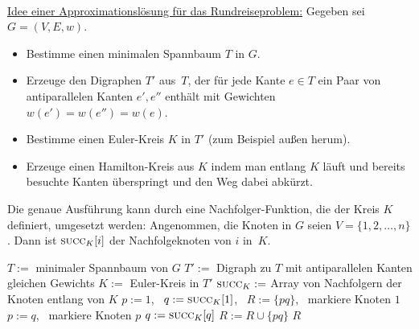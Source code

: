 \begin{bem}\,\\
\underline{Idee einer Approximationslösung für das Rundreiseproblem:} Gegeben sei $G=(V,E,w)$.
\begin{itemize}
 \item Bestimme einen minimalen Spannbaum $T$ in $G$.
 \item Erzeuge den Digraphen $T'$ aus~$T$, der für jede Kante $e \in T$ ein Paar von antiparallelen Kanten $e',e''$ enthält mit Gewichten $w(e')=w(e'')=w(e)$.
 \item Bestimme einen Euler-Kreis $K$ in $T'$ (zum Beispiel \glqq au\ss en herum\grqq).
 \item Erzeuge einen Hamilton-Kreis aus $K$ indem man entlang $K$ läuft und bereits besuchte Kanten überspringt und den Weg dabei \glqq abkürzt\grqq.
\end{itemize}
Die genaue Ausführung kann durch eine Nachfolger-Funktion, die der Kreis $K$ definiert, umgesetzt werden:
Angenommen, die Knoten in $G$ seien $V = \{1,2,\ldots,n\}$. Dann ist $\mathop{\text{\textsc{succ}}}_K[i]$ der Nachfolgeknoten von $i$ in~$K$.
\end{bem}


\begin{algorithm}[H]
\caption{$\cc{Rundreise-MSB}(G)$}
\begin{algorithmic}[1]
 \STATE $T :=$ minimaler Spannbaum von $G$
 \STATE $T' :=$ Digraph zu $T$ mit antiparallelen Kanten gleichen Gewichts
 \STATE $K :=$ Euler-Kreis in $T'$
 \STATE $\mathop{\text{\textsc{succ}}}_K :=$ Array von Nachfolgern der Knoten entlang von $K$
 \STATE $p := 1$, \ $q := \mathop{\text{\textsc{succ}}}_K[1]$, \ $R := \{pq\}$, \ markiere Knoten $1$
  \STATE $p := q$, \ markiere Knoten $p$
  \STATE {}
   \STATE $q := \mathop{\text{\textsc{succ}}}_K[q]$
  \ENDWHILE
  \STATE $R := R \cup \{pq\}$
 \ENDWHILE
 \RETURN $R$
\end{algorithmic}
\end{algorithm}


